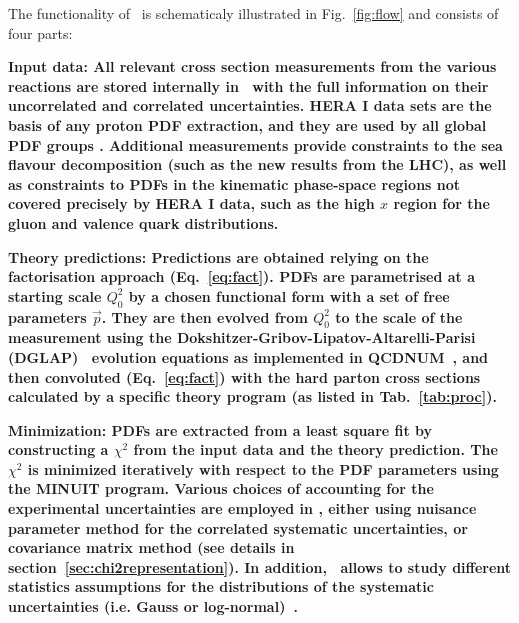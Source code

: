 %
\normalsize
The functionality of \fitter~is schematicaly illustrated in Fig.~\ref{fig:flow} and consists of four parts: %

\begin{description}
\item 
\bf {Input data:} \rm  All relevant cross section measurements from the various reactions
are stored internally in \fitter\ with the full information on their uncorrelated and correlated
uncertainties. HERA I data sets are the basis of any proton PDF extraction, and they are used by all global PDF groups \cite{MSTWpdf, CT10pdf, NNPDFpdf, ABMpdf, JRpdf}. Additional measurements provide constraints to the sea flavour decomposition (such as the new results from the LHC), as well as constraints to PDFs in the kinematic phase-space regions not covered precisely by HERA I data, such as the high $x$ region for the gluon and valence quark distributions.
\item
\bf{Theory predictions:} \rm Predictions are obtained relying on the factorisation approach (Eq.~\ref{eq:fact}). PDFs are parametrised at a starting scale $Q_0^2$  by a chosen functional form with a set of free parameters $\vec{p}$. They are then evolved from $Q_0^2$ to the scale of the measurement using the 
Dokshitzer-Gribov-Lipatov-Altarelli-Parisi 
(DGLAP)~\cite{Gribov:1972ri, Gribov:1972rt, Lipatov:1974qm,
Dokshitzer:1977sg, Altarelli:1977zs} evolution equations 
as implemented in QCDNUM~\cite{qcdnum}, 
and then convoluted (Eq.~\ref{eq:fact}) with the hard parton cross sections calculated by
a specific theory program (as listed in Tab.~\ref{tab:proc}).
\item
\bf{Minimization:} \rm  PDFs are extracted from a least square fit by constructing a 
$\chi^2$ from the input data and the theory prediction.
The $\chi^2$ is  minimized iteratively 
with respect to the PDF parameters using the MINUIT\cite{minuit} program.
Various choices of accounting for the experimental uncertainties are employed in \fitter, 
either using nuisance parameter method for the correlated systematic uncertainties, 
or covariance matrix method (see details in section~\ref{sec:chi2representation}). In addition, \fitter~allows to study different statistics 
assumptions for the distributions of the systematic uncertainties (i.e. Gauss or log-normal)~\cite{hera-lhc:report2009}.

\end{description}
